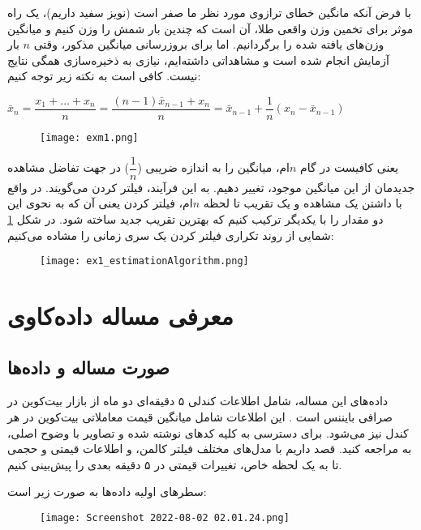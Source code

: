 \documentclass{scribe-cgenomics}
\begin{document}
با فرض آنکه مانگین خطای ترازوی مورد نظر ما صفر است (نویز سفید داریم)، یک راه موثر برای تخمین وزن واقعی طلا، آن است که چندین بار شمش را وزن کنیم و میانگین وزن‌های یافته شده را برگردانیم. اما برای بروزرسانی میانگین مذکور، وقتی
$n$
بار آزمایش انجام شده است و مشاهداتی داشته‌ایم، نیازی به ذخیره‌سازی همگی نتایج نیست.
کافی است به نکته زیر توجه کنیم:

\begin{center}
$
\bar{x}_n = \dfrac{x_1 + \dots + x_n}{n} = 
\dfrac{(n-1)\bar{x}_{n-1} + x_n}{n} = \bar{x}_{n-1} + \dfrac{1}{n}(x_n - \bar{x}_{n-1})
$
\end{center}

\begin{figure}
\texttt{[image: exm1.png]}
\centering
\end{figure}

یعنی کافیست در گام
$n$ام،
میانگین را به اندازه ضریبی ($\dfrac{1}{n}$) در جهت تفاضل مشاهده جدیدمان از این میانگین موجود، تغییر دهیم. به این فرآیند، فیلتر کردن می‌گویند. در واقع با داشتن یک مشاهده و یک تقریب تا لحظه
$n$ام،
فیلتر کردن یعنی آن که به نحوی این دو مقدار را با یکدیگر ترکیب کنیم که بهترین تقریب جدید ساخته شود. در شکل 
\ref{example1}
 شمایی از روند تکراری فیلتر کردن یک سری زمانی را مشاده می‌کنیم:

\begin{figure}\label{example1}
\texttt{[image: ex1\_estimationAlgorithm.png]}
\centering
\end{figure}




\section{معرفی مساله داده‌کاوی}
\subsection{صورت مساله و داده‌ها}
داده‌های این مساله، شامل اطلاعات کندلی ۵ دقیقه‌ای دو ماه از بازار بیت‌کوین در صرافی بایننس است
\cite{binance}. این اطلاعات شامل میانگین قیمت معاملاتی بیت‌کوین در هر کندل نیز می‌شود. برای دسترسی به کلیه کدهای نوشته شده و تصاویر با وضوح اصلی، به
\cite{git}
مراجعه کنید. قصد داریم با مدل‌های مختلف فیلتر کالمن، و اطلاعات قیمتی و حجمی تا به یک لحظه خاص، تغییرات قیمتی در ۵ دقیقه بعدی را پیش‌بینی کنیم.

سطرهای اولیه داده‌ها به صورت زیر است:

\begin{figure}
\texttt{[image: Screenshot 2022-08-02 02.01.24.png]}
\centering
\end{figure}
\end{document}
